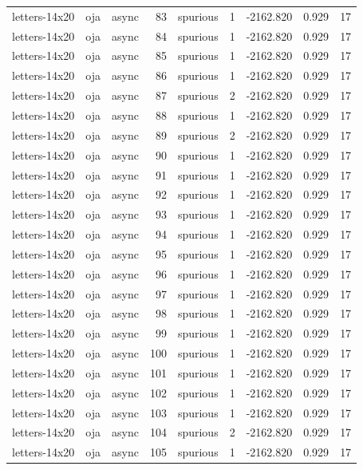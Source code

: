 \begin{tabular}{lllrlrrrr}
letters-14x20 & oja & async & 83 & spurious & 1 & -2162.820 & 0.929 & 17 \\
letters-14x20 & oja & async & 84 & spurious & 1 & -2162.820 & 0.929 & 17 \\
letters-14x20 & oja & async & 85 & spurious & 1 & -2162.820 & 0.929 & 17 \\
letters-14x20 & oja & async & 86 & spurious & 1 & -2162.820 & 0.929 & 17 \\
letters-14x20 & oja & async & 87 & spurious & 2 & -2162.820 & 0.929 & 17 \\
letters-14x20 & oja & async & 88 & spurious & 1 & -2162.820 & 0.929 & 17 \\
letters-14x20 & oja & async & 89 & spurious & 2 & -2162.820 & 0.929 & 17 \\
letters-14x20 & oja & async & 90 & spurious & 1 & -2162.820 & 0.929 & 17 \\
letters-14x20 & oja & async & 91 & spurious & 1 & -2162.820 & 0.929 & 17 \\
letters-14x20 & oja & async & 92 & spurious & 1 & -2162.820 & 0.929 & 17 \\
letters-14x20 & oja & async & 93 & spurious & 1 & -2162.820 & 0.929 & 17 \\
letters-14x20 & oja & async & 94 & spurious & 1 & -2162.820 & 0.929 & 17 \\
letters-14x20 & oja & async & 95 & spurious & 1 & -2162.820 & 0.929 & 17 \\
letters-14x20 & oja & async & 96 & spurious & 1 & -2162.820 & 0.929 & 17 \\
letters-14x20 & oja & async & 97 & spurious & 1 & -2162.820 & 0.929 & 17 \\
letters-14x20 & oja & async & 98 & spurious & 1 & -2162.820 & 0.929 & 17 \\
letters-14x20 & oja & async & 99 & spurious & 1 & -2162.820 & 0.929 & 17 \\
letters-14x20 & oja & async & 100 & spurious & 1 & -2162.820 & 0.929 & 17 \\
letters-14x20 & oja & async & 101 & spurious & 1 & -2162.820 & 0.929 & 17 \\
letters-14x20 & oja & async & 102 & spurious & 1 & -2162.820 & 0.929 & 17 \\
letters-14x20 & oja & async & 103 & spurious & 1 & -2162.820 & 0.929 & 17 \\
letters-14x20 & oja & async & 104 & spurious & 2 & -2162.820 & 0.929 & 17 \\
letters-14x20 & oja & async & 105 & spurious & 1 & -2162.820 & 0.929 & 17 \\

\end{tabular}

